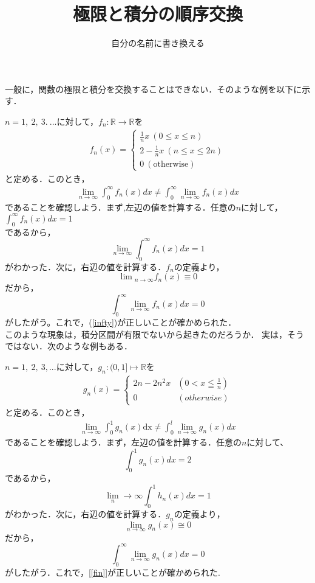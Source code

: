 \documentclass{jsarticle}
\title{極限と積分の順序交換}
\begin{document}
\author{自分の名前に書き換える}
\maketitle

一般に，関数の極限と積分を交換することはできない．そのような例を以下に示す．

$n=1,~2,~3.~\ldots$に対して，$f_{n}:\mathbb{R}\to\mathbb{R}$を
\begin{align*}
f_{n}(x)=
  \begin{cases}
  \frac{1}{n}x~(0\leq x\leq n)\\
  2-\frac{1}{n}x~(n\leq x\leq 2n)\\
  0~(\text{otherwise})
  \end{cases}
\end{align*}
と定める．このとき，
\begin{align}
 \lim_{n\to\infty}\int_{0}^{\infty}f_{n}(x)dx
 \neq\int_{0}^{\infty}\lim_{n\to\infty}f_{n}(x)dx\label{infty}
\end{align}
であることを確認しよう．まず,左辺の値を計算する．任意の$n$に対して，\\
$\int_{0}^{\infty}f_{n}(x)dx=1$\\
であるから，
\[
 \lim_{n\to\infty}\int_{0}^{\infty}f_{n}(x)dx=1
\]
がわかった．次に，右辺の値を計算する．$f_{n}$の定義より，
\[
 \lim{}_{n\to\infty}f_{n}(x)\equiv 0
\]
だから，
\[
 \int_{0}^{\infty}\lim_{n\to\infty}f_{n}(x)dx=0
\]
がしたがう。これで，(\ref{infty})が正しいことが確かめられた．\\
このような現象は，積分区間が有限でないから起きたのだろうか．
実は，そうではない．次のような例もある．

$n=1,~2,~3, ...$に対して，$g_{n}:(0,1]\mapsto\mathbb{R}$を
\begin{align*}
g_{n}(x)=
  \begin{cases}
  2n-2n^{2}x & (0<x≦\frac{1}{n})\\
  0 & (otherwise)
  \end{cases}
\end{align*}
と定める．このとき，
\begin{align}
 \lim_{n\to\infty}\int_{0}^{1}g_{n}(x)\mathrm{dx}
 \neq\int_{0}^{l}\lim_{n\to\infty}g_{n}(x)dx\label{fin}
\end{align}
であることを確認しよう．まず，左辺の値を計算する．任意の$n$に対して、
\[
 \int_{0}^{1}g_{n}(x)dx=2
\]
であるから，
\[
 \lim_n\to\infty\int_{0}^{1}h_{n}(x)dx=1
\]
がわかった．次に，右辺の値を計算する．$g_{n}の定義より，$
\[
 \lim_{n\to\infty}g_{n}(x)\cong 0
\]
だから，
\[
 \int_{0}^{\infty}\lim_{n\to\infty}g_{n}(x)dx=0
\]
がしたがう．これで，[\ref{fin}]が正しいことが確かめられた.
\end{document}
